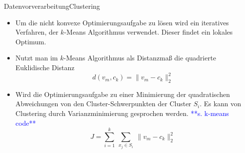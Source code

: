 \documentclass[169, handout	]{THIbeamer} %
\begin{document}
 	\begin{frame}{Datenvorverarbeitung}{Clustering}
 		\begin{itemize}
 			\item Um die nicht konvexe Optimierungsaufgabe zu lösen wird ein iteratives Verfahren, der $k$-Means Algorithmus verwendet. Dieser findet ein lokales Optimum.
 			\item Nutzt man im $k$-Means Algorithmus als Distanzmaß die quadrierte Euklidische Distanz
 			\begin{equation}
 			 	d(v_m, c_k) = \lVert v_m - c_k \rVert_2 ^2
 			\end{equation}
 			\item Wird die Optimierungsaufgabe zu einer Minimierung der quadratischen Abweichungen von den Cluster-Schwerpunkten der Cluster $S_i$. Es kann von Clustering durch Varianzminimierung gesprochen werden. \textcolor{blue}{**s. k-means code**}
 			\begin{equation}
				J = \sum_{i=1}^k\ \sum_{x_j \in S_i}^{}\ \lVert v_m - c_k \rVert_2^2
			\end{equation}
 		\end{itemize}
 	\end{frame}
%
\end{document}
